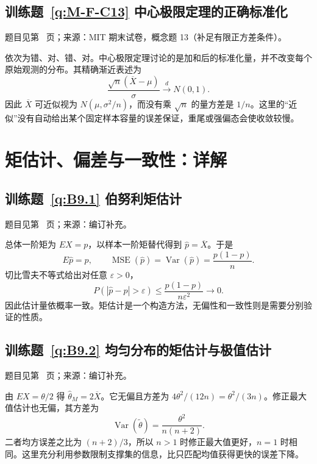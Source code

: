 \subsection*{训练题~\ref{q:M-F-C13} 中心极限定理的正确标准化}\label{a:M-F-C13}{\small 题目见第~\pageref{q:M-F-C13} 页；来源：MIT 期末试卷，概念题 13（补足有限正方差条件）。}
\begin{solve}依次为错、对、错、对。中心极限定理讨论的是加和后的标准化量，并不改变每个原始观测的分布。其精确渐近表述为\[\frac{\sqrt n(\overline X-\mu)}{\sigma}\xrightarrow{d}N(0,1).\]因此 $\overline X$ 可近似视为 $N(\mu,\sigma^2/n)$，而没有乘 $\sqrt n$ 的量方差是 $1/n$。这里的“近似”没有自动给出某个固定样本容量的误差保证，重尾或强偏态会使收敛较慢。\end{solve}

\clearpage\section*{矩估计、偏差与一致性：详解}

\subsection*{训练题~\ref{q:B9.1} 伯努利矩估计}\label{a:B9.1}{\small 题目见第~\pageref{q:B9.1} 页；来源：编订补充。}
\begin{solve}总体一阶矩为 $EX=p$，以样本一阶矩替代得到 $\widehat p=\overline X$。于是\[E\widehat p=p,\qquad\operatorname{MSE}(\widehat p)=\operatorname{Var}(\widehat p)=\frac{p(1-p)}n.\]切比雪夫不等式给出对任意 $\varepsilon>0$，\[P(|\widehat p-p|>\varepsilon)\le\frac{p(1-p)}{n\varepsilon^2}\longrightarrow0.\]因此估计量依概率一致。矩估计是一个构造方法，无偏性和一致性则是需要分别验证的性质。\end{solve}

\subsection*{训练题~\ref{q:B9.2} 均匀分布的矩估计与极值估计}\label{a:B9.2}{\small 题目见第~\pageref{q:B9.2} 页；来源：编订补充。}
\begin{solve}由 $EX=\theta/2$ 得 $\widehat\theta_M=2\overline X$。它无偏且方差为 $4\theta^2/(12n)=\theta^2/(3n)$。修正最大值估计也无偏，其方差为\[\operatorname{Var}(\widetilde\theta)=\frac{\theta^2}{n(n+2)}.\]二者均方误差之比为 $(n+2)/3$，所以 $n>1$ 时修正最大值更好，$n=1$ 时相同。这里充分利用参数限制支撑集的信息，比只匹配均值获得更快的误差下降。\end{solve}

